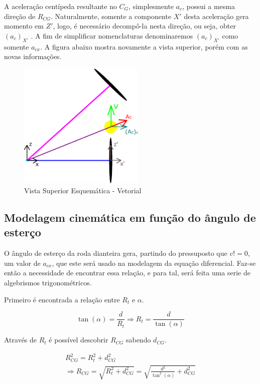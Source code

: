 \documentclass[conference,harvard,brazil,english]{sbatex}
\begin{document}
            A aceleração centípeda resultante no $C_G$, simplesmente $a_c$, possui a mesma direção de $R_{CG}$. Naturalmente, somente a componente $X'$ desta aceleração gera momento em $Z'$, logo, é necessário decompô-la nesta direção, ou seja, obter $(a_c)_{X'}$ . A fim de simplificar nomenclaturas denominaremos $(a_c)_{X'}$ como somente $a_{cx}$. A figura abaixo mostra novamente a vista superior, porém com as novas informações.

            \begin{figure}[h]
            \centering
            \includegraphics[width=6cm]{imagens/geometria/VistaSuperiorVetorial.eps}
            \caption{Vista Superior Esquemática - Vetorial}
            \end{figure}
            
        \subsection{Modelagem cinemática em função do ângulo de esterço}
        
            O ângulo de esterço da roda dianteira gera, partindo do pressuposto que $v!=0$, um valor de $a_{cx}$, que este será usado na modelagem da equação diferencial. Faz-se então a necessidade de encontrar essa relação, e para tal, será feita uma serie de algebrismos trigonométricos.
            
            Primeiro é encontrada a relação entre $R_t$ e $\alpha$.
            
            \begin{equation}
                \tan(\alpha) = \frac{d}{R_t} \Rightarrow R_t = \frac{d}{\tan(\alpha)}
            \end{equation}
            
            Através de $R_t$ é possível descobrir $ R_{CG}$ sabendo $d_{CG}$.
            
            \begin{eqnarray}
                R_{CG}^2 = R_t^2 + d_{CG}^2 \nonumber \\
                \Rightarrow R_{CG} = \sqrt{R_t^2 + d_{CG}^2} = \sqrt{\frac{d^2}{\tan^2(\alpha)} + d_{CG}^2}
            \end{eqnarray}
            
\end{document}
